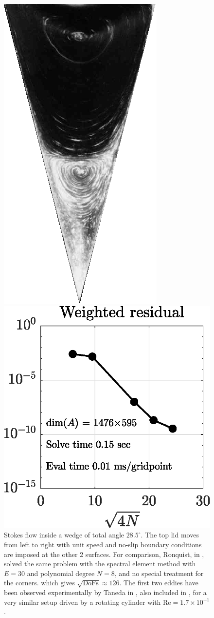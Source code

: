\begin{figure}[H]
\begin{minipage}{0.45\linewidth}
		\includegraphics[width=0.6\linewidth]{Figures/wedge_exp}
	\end{minipage}

	\includegraphics[width=0.5\linewidth]{Figures/wedge_conv}
	
	
	\label{fig:wedge}
	\caption{Stokes flow inside a wedge of total angle $28.5^\circ$. The top lid moves from left to right with unit speed and no-slip boundary conditions are imposed at the other 2 surfaces. For comparison, Ronquist, in \cite[Fig.~12]{Ronquist88}, solved the same problem with the spectral element method with $E=30$ and polynomial degree $N=8$, and no special treatment for the corners. which gives $\sqrt{\text{DoFs}}\approx 126$. The first two eddies have been observed experimentally by Taneda in \cite[Fig.~19]{Taneda79}, also included in \cite[Fig.~10]{VanDyke82}, for a very similar setup driven by a rotating cylinder with $\text{Re}=1.7\times10^{-1}$.}
\end{figure} 

